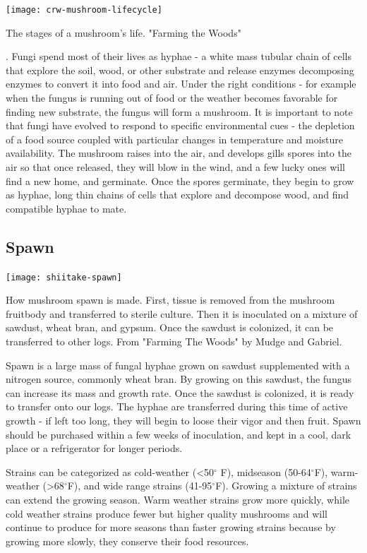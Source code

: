 \documentclass{tufte-handout}
\begin{document}
\begin{marginfigure}
\texttt{[image: crw-mushroom-lifecycle]}
\caption{The stages of a mushroom's life. "Farming the Woods"}
\end{marginfigure}

. 
Fungi spend most of their lives as hyphae - a white mass tubular chain of cells that explore the soil, wood, or other substrate and release enzymes decomposing enzymes to convert it into food and air. 
Under the right conditions - for example when the fungus is running out of food or the weather becomes favorable for finding new substrate, the fungus will form a mushroom.
It is important to note that fungi have evolved to respond to specific environmental cues - the depletion of a food source coupled with particular changes in temperature and moisture availability. 
The mushroom raises into the air, and develops gills spores into the air so that once released, they will blow in the wind, and a few lucky ones will find a new home, and germinate.
Once the spores germinate, they begin to grow as hyphae, long thin chains of cells that explore and decompose wood, and find compatible hyphae to mate.

\subsection{Spawn}

\begin{marginfigure}
\texttt{[image: shiitake-spawn]}
\caption{How mushroom spawn is made. First, tissue is removed from the mushroom fruitbody and transferred to  sterile culture. Then it is inoculated on a mixture of sawdust, wheat bran, and gypsum. Once the sawdust is colonized, it can be transferred to other logs. From "Farming The Woods" by Mudge and Gabriel.}
\end{marginfigure}

Spawn is a large mass of fungal hyphae grown on sawdust supplemented with a nitrogen source, commonly wheat bran. 
By growing on this sawdust, the fungus can increase its mass and growth rate. Once the sawdust is colonized, it is ready to transfer onto our logs.
The hyphae are transferred during this time of active growth  - if left too long, they will begin to loose their vigor and then fruit. 
Spawn should be purchased within a few weeks of inoculation, and kept in a cool, dark place or a refrigerator for longer periods. 

Strains can be categorized as cold-weather (<50$^{\circ}$ F), midseason (50-64$^{\circ}$F), warm-weather (>68$^{\circ}$F), and wide range strains (41-95$^{\circ}$F). 
Growing a mixture of strains can extend the growing season. 
Warm weather strains grow more quickly, while cold weather strains produce fewer but higher quality mushrooms and will continue to produce for more seasons than faster growing strains because by growing more slowly, they conserve their food resources.
\end{document}
